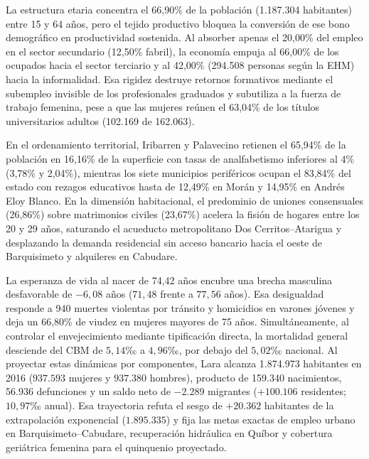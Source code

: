 \documentclass[12pt,letterpaper]{article}
\begin{document}
La estructura etaria concentra el 66,90\% de la población (1.187.304 habitantes) entre 15 y 64 años, pero el tejido productivo bloquea la conversión de ese bono demográfico en productividad sostenida. Al absorber apenas el 20,00\% del empleo en el sector secundario (12,50\% fabril), la economía empuja al 66,00\% de los ocupados hacia el sector terciario y al 42,00\% (294.508 personas según la EHM) hacia la informalidad. Esa rigidez destruye retornos formativos mediante el subempleo invisible de los profesionales graduados y subutiliza a la fuerza de trabajo femenina, pese a que las mujeres reúnen el 63,04\% de los títulos universitarios adultos (102.169 de 162.063).

En el ordenamiento territorial, Iribarren y Palavecino retienen el 65,94\% de la población en 16,16\% de la superficie con tasas de analfabetismo inferiores al 4\% (3,78\% y 2,04\%), mientras los siete municipios periféricos ocupan el 83,84\% del estado con rezagos educativos hasta de 12,49\% en Morán y 14,95\% en Andrés Eloy Blanco. En la dimensión habitacional, el predominio de uniones consensuales (26,86\%) sobre matrimonios civiles (23,67\%) acelera la fisión de hogares entre los 20 y 29 años, saturando el acueducto metropolitano Dos Cerritos--Atarigua y desplazando la demanda residencial sin acceso bancario hacia el oeste de Barquisimeto y alquileres en Cabudare.

La esperanza de vida al nacer de 74,42 años encubre una brecha masculina desfavorable de $-6,08$ años ($71,48$ frente a $77,56$ años). Esa desigualdad responde a 940 muertes violentas por tránsito y homicidios en varones jóvenes y deja un 66,80\% de viudez en mujeres mayores de 75 años. Simultáneamente, al controlar el envejecimiento mediante tipificación directa, la mortalidad general desciende del CBM de $5,14\text{‰}$ a $4,96\text{‰}$, por debajo del $5,02\text{‰}$ nacional. Al proyectar estas dinámicas por componentes, Lara alcanza 1.874.973 habitantes en 2016 ($937.593$ mujeres y $937.380$ hombres), producto de 159.340 nacimientos, 56.936 defunciones y un saldo neto de $-2.289$ migrantes ($+100.106$ residentes; $10,97\text{‰}$ anual). Esa trayectoria refuta el sesgo de $+20.362$ habitantes de la extrapolación exponencial ($1.895.335$) y fija las metas exactas de empleo urbano en Barquisimeto--Cabudare, recuperación hidráulica en Quíbor y cobertura geriátrica femenina para el quinquenio proyectado.

\end{document}
